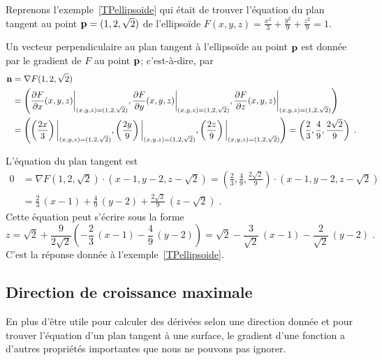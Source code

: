 {\begin{egg}
Reprenons l'exemple~\ref{TPellipsoide} qui était de trouver l'équation du
plan tangent au point $\mathbf{p} = (1,2,\sqrt{2})$ de l'ellipsoïde
$\displaystyle F(x,y,z) = \frac{x^2}{3} + \frac{y^2}{9} + \frac{z^2}{9} = 1$.

Un vecteur perpendiculaire au plan tangent à l'ellipsoïde au point
$\mathbf{p}$ est donnée par le gradient de $F$ au point $\mathbf{p}$;
c'est-à-dire, par
\begin{align*}
\mathbf{n} &= \nabla F(1,2,\sqrt{2}) \\
&= \left(\frac{\partial F}{\partial x}(x,y,z)\bigg|_{(x,y,z)=(1,2,\sqrt{2})} ,
\frac{\partial F}{\partial y}(x,y,z)\bigg|_{(x,y,z)=(1,2,\sqrt{2})},
\frac{\partial F}{\partial z}(x,y,z)\bigg|_{(x,y,z)=(1,2,\sqrt{2})} \right) \\
&= \left( \left(\frac{2x}{3}\right)\bigg|_{(x,y,z)=(1,2,\sqrt{2})} ,
\left(\frac{2y}{9}\right)\bigg|_{(x,y,z)=(1,2,\sqrt{2})},
\left(\frac{2z}{9}\right)\bigg|_{(x,y,z)=(1,2,\sqrt{2})} \right)
= \left(\frac{2}{3} ,\frac{4}{9}, \frac{2\sqrt{2}}{9} \right) \; .
\end{align*}

L'équation du plan tangent est
\begin{align*}
0 &= \nabla F(1,2,\sqrt{2})\cdot(x-1, y-2, z- \sqrt{2})
= \left( \frac{2}{3} , \frac{4}{9}, \frac{2\sqrt{2}}{9} \right)
\cdot (x-1, y-2, z- \sqrt{2}) \\
&= \frac{2}{3} \, (x-1) + \frac{4}{9} \, (y-2) +
\frac{2\sqrt{2}}{9}\,(z- \sqrt{2}) \; .
\end{align*}
Cette équation peut s'écrire sous la forme
\[
z = \sqrt{2} + \frac{9}{2\sqrt{2}} \left(
-\frac{2}{3} \, (x-1) - \frac{4}{9} \, (y-2) \right)
= \sqrt{2} - \frac{3}{\sqrt{2}} \, (x-1) - \frac{2}{\sqrt{2}} \, (y-2) \; .
\]
C'est la réponse donnée à l'exemple~\ref{TPellipsoide}.
\end{egg}

\subsection{Direction de croissance maximale}

En plus d'être utile pour calculer des dérivées selon une direction donnée et
pour trouver l'équation d'un plan tangent à une surface, le gradient d'une
fonction a d'autres propriétés importantes que nous ne pouvons pas ignorer.

}
